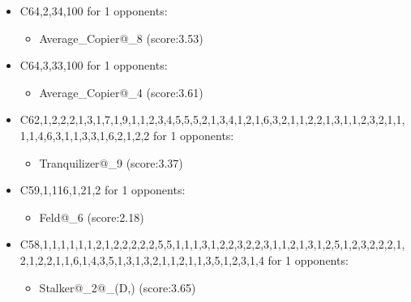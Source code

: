 \begin{appendices}
\begin{itemize}
        \item C64,2,34,100 for 1 opponents:
        \begin{multicols}{3}
            \begin{itemize}
                \item Average\_Copier@\_8 (score:3.53)
            \end{itemize}
        \end{multicols}

        \item C64,3,33,100 for 1 opponents:
        \begin{multicols}{3}
            \begin{itemize}
                \item Average\_Copier@\_4 (score:3.61)
            \end{itemize}
        \end{multicols}

        \item C62,1,2,2,2,1,3,1,7,1,9,1,1,2,3,4,5,5,5,2,1,3,4,1,2,1,6,3,2,1,1,2,2,1,3,1,1,2,3,2,1,1,1,1,4,6,3,1,1,3,3,1,6,2,1,2,2 for 1 opponents:
        \begin{multicols}{3}
            \begin{itemize}
                \item Tranquilizer@\_9 (score:3.37)
            \end{itemize}
        \end{multicols}

        \item C59,1,116,1,21,2 for 1 opponents:
        \begin{multicols}{3}
            \begin{itemize}
                \item Feld@\_6 (score:2.18)
            \end{itemize}
        \end{multicols}

        \item C58,1,1,1,1,1,1,2,1,2,2,2,2,2,5,5,1,1,1,3,1,2,2,3,2,2,3,1,1,2,1,3,1,2,5,1,2,3,2,2,2,1,2,1,2,2,1,1,6,1,4,3,5,1,3,1,3,2,1,1,2,1,1,3,5,1,2,3,1,4 for 1 opponents:
        \begin{multicols}{3}
            \begin{itemize}
                \item Stalker@\_2@\_(D,) (score:3.65)
            \end{itemize}
        \end{multicols}


\end{itemize}
\end{appendices}
